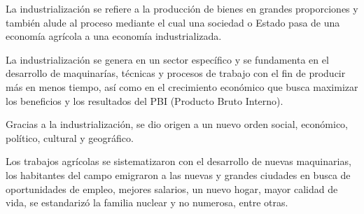 \documentclass{report}
\begin{document}
La industrialización se refiere a la producción de bienes en grandes
proporciones y también alude al proceso mediante el cual una sociedad o Estado
pasa de una economía agrícola a una economía industrializada.

La industrialización se genera en un sector específico y se fundamenta en el
desarrollo de maquinarías, técnicas y procesos de trabajo con el fin de
producir más en menos tiempo, así como en el crecimiento económico que busca
maximizar los beneficios y los resultados del PBI (Producto Bruto Interno).

Gracias a la industrialización, se dio origen a un nuevo orden social,
económico, político, cultural y geográfico.

Los trabajos agrícolas se sistematizaron con el desarrollo de nuevas
maquinarias, los habitantes del campo emigraron a las nuevas y grandes ciudades
en busca de oportunidades de empleo, mejores salarios, un nuevo hogar, mayor
calidad de vida, se estandarizó la familia nuclear y no numerosa, entre otras.
\end{document}
